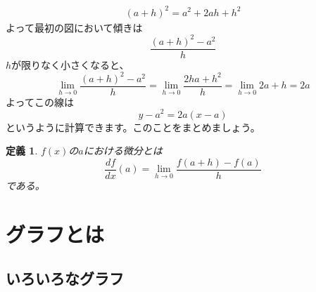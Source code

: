 \documentclass{ltjsarticle}
\newtheorem{definition}{定義}[section]
\begin{document}
\begin{align*}
(a+h)^2 = a^2+2ah+h^2
\end{align*}
よって最初の図において傾きは
\begin{equation*}
{\frac {(a+h)^2-a^2} {h}} 
\end{equation*}
$h$が限りなく小さくなると、
\begin{equation*}
\lim_{h\to0} {\frac {(a+h)^2-a^2} {h}} = \lim_{h\to0}{\frac {2ha+h^2} h} = \lim_{h\to0}2a+h = 2a
\end{equation*}
よってこの線は
\begin{equation*}
y - a^2 = 2a(x-a)
\end{equation*}
というように計算できます。このことをまとめましょう。
\begin{definition}
$f(x)$の$a$における微分とは
\begin{equation*}
{\frac {df} {dx}}(a) = \lim_{h\to0}{\frac {f(a+h)-f(a)} h}
\end{equation*}
である。
\end{definition}



\section{グラフとは}

\subsection{いろいろなグラフ}
\end{document}
